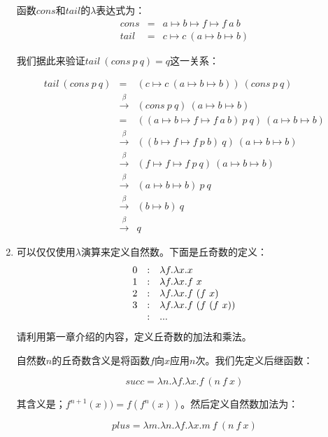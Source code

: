 \documentclass[UTF8]{article}
\begin{document}
\begin{enumerate}
函数$cons$和$tail$的$\lambda$表达式为：
\[
\begin{array}{rcl}
cons & = & a \mapsto b \mapsto f \mapsto f\ a\ b \\
tail & = & c \mapsto c\ (a \mapsto b \mapsto b)
\end{array}
\]

我们据此来验证$tail\ (cons\ p\ q) = q$这一关系：

\[
\begin{array}{rcl}
tail\ (cons\ p\ q) & = & (c \mapsto c\ (a \mapsto b \mapsto b))\ (cons\ p\ q) \\
                   & \xrightarrow{\beta} & (cons\ p\ q)\ (a \mapsto b \mapsto b) \\
                   & = & ((a \mapsto b \mapsto f \mapsto f\ a\ b)\ p\ q)\ (a \mapsto b \mapsto b) \\
                   & \xrightarrow{\beta} & ((b \mapsto f \mapsto f\ p\ b)\ q)\ (a \mapsto b \mapsto b) \\
                   & \xrightarrow{\beta} & (f \mapsto f \mapsto f\ p\ q)\ (a \mapsto b \mapsto b) \\
                   & \xrightarrow{\beta} & (a \mapsto b \mapsto b)\ p\ q \\
                   & \xrightarrow{\beta} & (b \mapsto b)\ q \\
                   & \xrightarrow{\beta} & q
\end{array}
\]

\item 可以仅仅使用$\lambda$演算来定义自然数。下面是丘奇数的定义：
\[
\begin{array}{r@{\quad:\quad}l}
0 & \lambda f . \lambda x . x \\
1 & \lambda f . \lambda x . f\ x \\
2 & \lambda f . \lambda x . f\ (f\ x) \\
3 & \lambda f . \lambda x . f\ (f\ (f\ x)) \\
  & ...
\end{array}
\]
请利用第一章介绍的内容，定义丘奇数的加法和乘法。

自然数$n$的丘奇数含义是将函数$f$向$x$应用$n$次。我们先定义后继函数：

\[
succ = \lambda n . \lambda f . \lambda x . f\ (n\ f\ x)
\]

其含义是；$f^{n+1}(x)) = f(f^n(x))$。然后定义自然数加法为：

\[
plus = \lambda m . \lambda n . \lambda f . \lambda x . m\ f\ (n\ f\ x)
\]


\end{enumerate}
\end{document}

